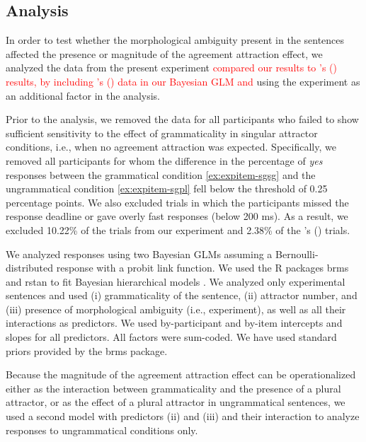 \documentclass[apacite,linguex]{glossa}\usepackage[]{graphicx}\usepackage[]{color}
\newcommand{\revise}[1]{\textcolor{red}{#1}}
\begin{document}
\subsection{Analysis}

In order to test whether the morphological ambiguity present in the \citet{LagoEtAl:2019} sentences affected the presence or magnitude of the agreement attraction effect, we analyzed the data from the present experiment \revise{compared our results to \citeauthor{LagoEtAl:2019}'s (\citeyear{LagoEtAl:2019}) results, by including \citeauthor{LagoEtAl:2019}'s (\citeyear{LagoEtAl:2019}) data in our Bayesian GLM and} using the experiment as an additional factor in the analysis.
  
Prior to the analysis, we removed the data for all participants who failed to show sufficient sensitivity to the effect of grammaticality in singular attractor conditions, i.e., when no agreement attraction was expected. Specifically, we removed all participants for whom the difference in the percentage of \textit{yes} responses between the grammatical condition \ref{ex:expitem-sgsg} and the ungrammatical condition \ref{ex:expitem-sgpl} fell below the threshold of 0.25 percentage points. We also excluded trials in which the participants missed the response deadline or gave overly fast responses (below 200 ms). As a result, we excluded 10.22\% of the trials from our experiment and 2.38\% of the \citeauthor{LagoEtAl:2019}'s (\citeyear{LagoEtAl:2019}) trials. 

We analyzed responses using two Bayesian GLMs assuming a Bernoulli-distributed response with a probit link function.  We used the R packages brms \citep{brms} and rstan \citep{rstan} to fit Bayesian hierarchical models \citep[e.g.,][]{GelmanHill:2007, NicenboimVasishth:2016}. 
We analyzed only experimental sentences and used (i) grammaticality of the sentence, (ii) attractor number, and (iii) presence of morphological ambiguity (i.e., experiment), as well as all their interactions as predictors. We used by-participant and by-item intercepts and slopes for all predictors. 
All factors were sum-coded. We have used standard priors provided by the brms package. 

Because the magnitude of the agreement attraction effect can be operationalized either as the interaction between grammaticality and the presence of a plural attractor, or as the effect of a plural attractor in ungrammatical sentences, we used a second model with predictors (ii) and (iii) and their interaction to analyze responses to ungrammatical conditions only.
\end{document}
